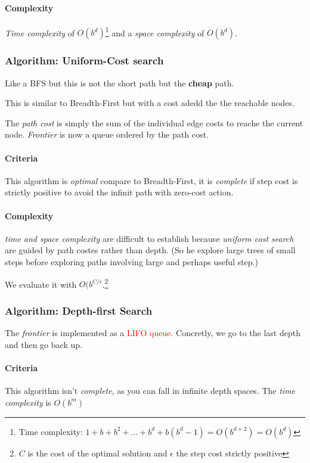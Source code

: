 \paragraph{Complexity} \textit{Time complexity} of $O(b^d)$\footnote{Time complexity: $1+b+b^2+...+b^d+b(b^d-1) = O(b^{d+2}) = O(b^d)$} and a \textit{space complexity} of $O(b^d)$. 

\subsubsection{Algorithm: Uniform-Cost search}

Like a BFS but this is not the short path but the \textbf{cheap} path.

This is similar to Breadth-First but with a cost adedd the the reachable
nodes. 

The \textit{path  cost} is simply the sum of  the individual edge
costs  to reache  the current  node.  \textit{Frontier} is  now a  queue
ordered by the path cost.

\paragraph{Criteria}
This algorithm is \textit{optimal} compare to Breadth-First, it is \textit{complete} if step cost is strictly positive to avoid the infinit path with zero-cost action.

\paragraph{Complexity}

\textit{time and  space complexity}  are difficult to  establish because
\textit{uniform cost search} are guided by path costes rather than depth.
(So he explore large trees of  small steps before
exploring paths involving large and perhaps useful step.)

We evaluate it with $O(b^{C/\epsilon}$.\footnote{$C$ is the cost of the optimal solution and $\epsilon$ the step cost strictly positive}

\subsubsection{Algorithm: Depth-first Search}

The \textit{frontier}  is implemented as a  \textcolor{red}{LIFO queue}.
Concretly, we go to the last depth and then go back up.

\paragraph{Criteria}
This algorithm isn't \textit{complete}, as you can fall in infinite depth spaces. The \textit{time complexity} is $O(b^m)$ 

